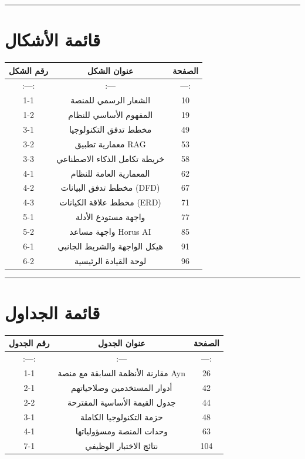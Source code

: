 \documentclass[12pt, a4paper]{report}
\begin{document}
\begin{english}
\vspace{0.5cm}\hrule\vspace{0.5cm}

\chapter*{قائمة الأشكال}

\begin{longtable}{|c|c|c|}
\hline
رقم الشكل & عنوان الشكل & الصفحة \\ \hline
:---: & :--- & ---: \\ \hline
1-1 & الشعار الرسمي للمنصة & 10 \\ \hline
1-2 & المفهوم الأساسي للنظام & 19 \\ \hline
3-1 & مخطط تدفق التكنولوجيا & 49 \\ \hline
3-2 & معمارية تطبيق RAG & 53 \\ \hline
3-3 & خريطة تكامل الذكاء الاصطناعي & 58 \\ \hline
4-1 & المعمارية العامة للنظام & 62 \\ \hline
4-2 & مخطط تدفق البيانات (DFD) & 67 \\ \hline
4-3 & مخطط علاقة الكيانات (ERD) & 71 \\ \hline
5-1 & واجهة مستودع الأدلة & 77 \\ \hline
5-2 & واجهة مساعد Horus AI & 85 \\ \hline
6-1 & هيكل الواجهة والشريط الجانبي & 91 \\ \hline
6-2 & لوحة القيادة الرئيسية & 96 \\ \hline
\end{longtable}

\vspace{0.5cm}\hrule\vspace{0.5cm}

\chapter*{قائمة الجداول}

\begin{longtable}{|c|c|c|}
\hline
رقم الجدول & عنوان الجدول & الصفحة \\ \hline
:---: & :--- & ---: \\ \hline
1-1 & مقارنة الأنظمة السابقة مع منصة Ayn & 26 \\ \hline
2-1 & أدوار المستخدمين وصلاحياتهم & 42 \\ \hline
2-2 & جدول القيمة الأساسية المقترحة & 44 \\ \hline
3-1 & حزمة التكنولوجيا الكاملة & 48 \\ \hline
4-1 & وحدات المنصة ومسؤولياتها & 63 \\ \hline
7-1 & نتائج الاختبار الوظيفي & 104 \\ \hline
\end{longtable}


\end{english}
\end{document}
